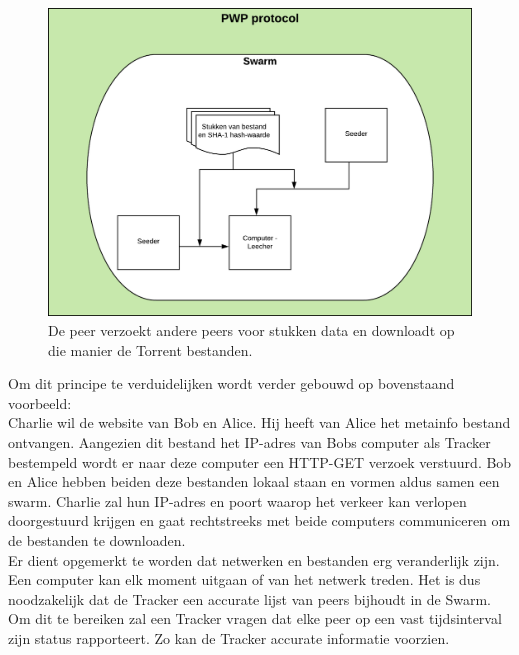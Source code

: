 \begin{figure}[h!]
	\centering
		\includegraphics[scale=0.6]{torrent-3.png}
	\caption[PWP stap - Torrenting 3]{De peer verzoekt andere peers voor stukken data en downloadt op die manier de Torrent bestanden.}
\end{figure}
\newpage
Om dit principe te verduidelijken wordt verder gebouwd op bovenstaand voorbeeld:\\

Charlie wil de website van Bob en Alice. Hij heeft van Alice het metainfo bestand ontvangen. Aangezien dit bestand het IP-adres van Bobs computer als Tracker bestempeld wordt er naar deze computer een HTTP-GET verzoek verstuurd. Bob en Alice hebben beiden deze bestanden lokaal staan en vormen aldus samen een swarm. Charlie zal hun IP-adres en poort waarop het verkeer kan verlopen doorgestuurd krijgen en gaat rechtstreeks met beide computers communiceren om de bestanden te downloaden.\\

Er dient opgemerkt te worden dat netwerken en bestanden erg veranderlijk zijn. Een computer kan elk moment uitgaan of van het netwerk treden. Het is dus noodzakelijk dat de Tracker een accurate lijst van peers bijhoudt in de Swarm. Om dit te bereiken zal een Tracker vragen dat elke peer op een vast tijdsinterval zijn status rapporteert. Zo kan de Tracker accurate informatie voorzien.\\

